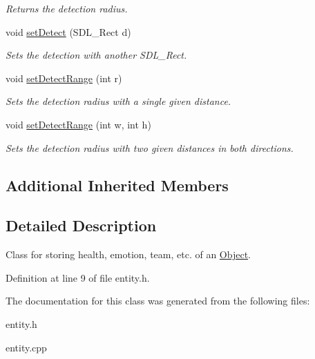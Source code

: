 \begin{DoxyCompactItemize}
\begin{DoxyCompactList}\small\item\em Returns the detection radius. \end{DoxyCompactList}\item 
void \hyperlink{classEntity_a7624a9b21bbb1bd97d7f2eac20339a82}{set\+Detect} (S\+D\+L\+\_\+\+Rect d)\hypertarget{classEntity_a7624a9b21bbb1bd97d7f2eac20339a82}{}\label{classEntity_a7624a9b21bbb1bd97d7f2eac20339a82}

\begin{DoxyCompactList}\small\item\em Sets the detection with another S\+D\+L\+\_\+\+Rect. \end{DoxyCompactList}\item 
void \hyperlink{classEntity_a884a7f8a537f3d0e926dfedb8e88a740}{set\+Detect\+Range} (int r)\hypertarget{classEntity_a884a7f8a537f3d0e926dfedb8e88a740}{}\label{classEntity_a884a7f8a537f3d0e926dfedb8e88a740}

\begin{DoxyCompactList}\small\item\em Sets the detection radius with a single given distance. \end{DoxyCompactList}\item 
void \hyperlink{classEntity_af4b91451301036e4aed029e90a7ba726}{set\+Detect\+Range} (int w, int h)\hypertarget{classEntity_af4b91451301036e4aed029e90a7ba726}{}\label{classEntity_af4b91451301036e4aed029e90a7ba726}

\begin{DoxyCompactList}\small\item\em Sets the detection radius with two given distances in both directions. \end{DoxyCompactList}\end{DoxyCompactItemize}
\subsection*{Additional Inherited Members}


\subsection{Detailed Description}
Class for storing health, emotion, team, etc. of an \hyperlink{classObject}{Object}. 

Definition at line 9 of file entity.\+h.



The documentation for this class was generated from the following files\+:\begin{DoxyCompactItemize}
\item 
entity.\+h\item 
entity.\+cpp\end{DoxyCompactItemize}
